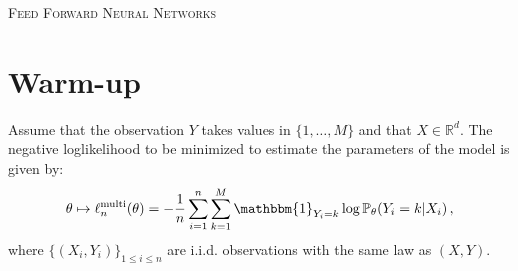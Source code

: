 \documentclass[a4paper,10pt,fleqn]{article}
\newcommand{\1}{\ensuremath{\mathbbm{1}}}
\begin{document}

\noindent\hrulefill

\begin{center}
\textsc{Feed Forward Neural Networks}
\end{center}
\hrulefill

\medskip



\section{Warm-up}
Assume that the observation $Y$ takes values in $\{1,\ldots,M\}$ and that $X\in\mathbb{R}^d$. The negative loglikelihood to be minimized to estimate the parameters of the model is given by:
$$
\theta \mapsto \ell^{\mathrm{multi}}_n(\theta)= -\frac{1}{n} \sum_{i=1}^n\sum_{k=1}^{M} \1_{Y_i=k}\log \mathbb{P}_{\theta}(Y_i = k | X_i)\,,
$$
where $\{(X_i,Y_i)\}_{1\leqslant i\leqslant n}$ are i.i.d. observations with the same law as $(X,Y)$. 
\end{document}
